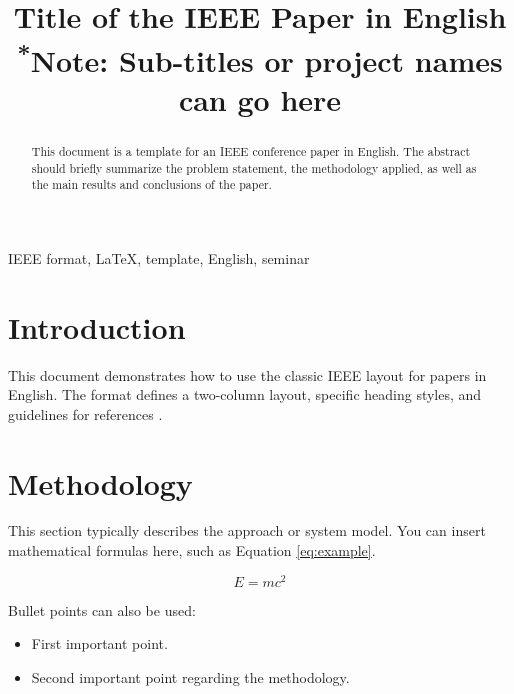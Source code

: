 \documentclass[conference, a4paper]{IEEEtran}
\begin{document}
\title{Title of the IEEE Paper in English\\
{\footnotesize \textsuperscript{*}Note: Sub-titles or project names can go here}}

\author{
\and
{}
}

\maketitle

\begin{abstract}
This document is a template for an IEEE conference paper in English. The abstract should briefly summarize the problem statement, the methodology applied, as well as the main results and conclusions of the paper.
\end{abstract}

\begin{IEEEkeywords}
IEEE format, LaTeX, template, English, seminar
\end{IEEEkeywords}

\section{Introduction}
This document demonstrates how to use the classic IEEE layout for papers in English. The format defines a two-column layout, specific heading styles, and guidelines for references \cite{b1}.

\section{Methodology}
This section typically describes the approach or system model. You can insert mathematical formulas here, such as Equation \eqref{eq:example}.

\begin{equation}
E = mc^2 \label{eq:example}
\end{equation}

Bullet points can also be used:
\begin{itemize}
    \item First important point.
    \item Second important point regarding the methodology.
\end{itemize}
\end{document}
